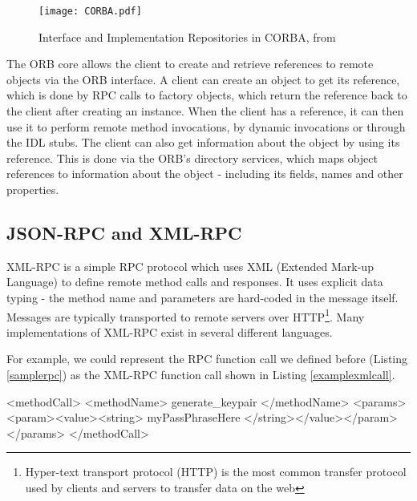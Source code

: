 \begin{figure}
    \centering
    \texttt{[image: CORBA.pdf]}
    \caption{Interface and Implementation Repositories in CORBA, from \cite{isocorba}}
    \label{fig:corba-interfaces}
\end{figure}

The ORB core allows the client to create and retrieve references to remote objects via the ORB interface. A client can create an object to get its reference, which is done by RPC calls to factory objects, which return the reference back to the client after creating an instance. When the client has a reference, it can then use it to perform remote method invocations, by dynamic invocations or through the IDL stubs. The client can also get information about the object by using its reference. This is done via the ORB's directory services, which maps object references to information about the object - including its fields, names and other properties.  \cite{vinoski1997corba}



\subsection{JSON-RPC and XML-RPC} %
\label{sub:json_xml_rpc_intro}
XML-RPC is a simple RPC protocol which uses XML (Extended Mark-up Language) to define remote method calls and responses. It uses explicit data typing - the method name and parameters are hard-coded in the message itself. Messages are typically transported to remote servers over HTTP\footnote{Hyper-text transport protocol (HTTP) is the most common transfer protocol used by clients and servers to transfer data on the web}. Many implementations of XML-RPC exist in several different languages. 

For example, we could represent the RPC function call we defined before (Listing \ref{samplerpc}) as the XML-RPC function call shown in Listing \ref{examplexmlcall}.

\begin{code}
<methodCall>
  <methodName>
    generate_keypair
  </methodName>
  <params>
    <param><value><string> myPassPhraseHere </string></value></param>
  </params>
</methodCall>
\end{code}

